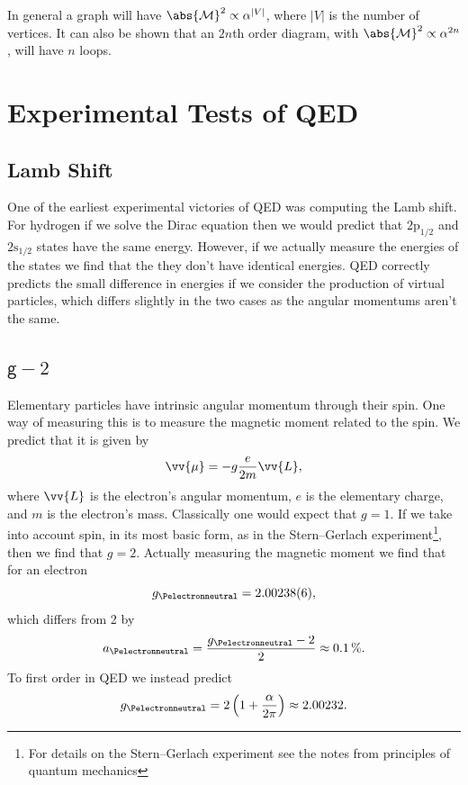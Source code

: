 \documentclass[fleqn]{NotesClass}
\newcommand*{\matrixelement}{\mathcal{M}}
\begin{document}
    In general a graph will have \(\abs{\matrixelement}^2 \propto \alpha^{|V|}\), where \(|V|\) is the number of vertices.
    It can also be shown that an \(2n\)th order diagram, with \(\abs{\matrixelement}^2 \propto \alpha^{2n}\), will have \(n\) loops.
    
    \section{Experimental Tests of QED}
    \subsection{Lamb Shift}
    One of the earliest experimental victories of QED was computing the Lamb shift.
    For hydrogen if we solve the Dirac equation then we would predict that \(2\mathrm{p}_{1/2}\) and \(2\mathrm{s}_{1/2}\) states have the same energy.
    However, if we actually measure the energies of the states we find that the they don't have identical energies.
    QED correctly predicts the small difference in energies if we consider the production of virtual particles, which differs slightly in the two cases as the angular momentums aren't the same.
    
    \subsection{\texorpdfstring{\(\mathsf{g}-2\)}{g - 2}}
    Elementary particles have intrinsic angular momentum through their spin.
    One way of measuring this is to measure the magnetic moment related to the spin.
    We predict that it is given by
    \begin{equation}
        \vv{\mu} = -g\frac{e}{2m}\vv{L},
    \end{equation}
    where \(\vv{L}\) is the electron's angular momentum, \(e\) is the elementary charge, and \(m\) is the electron's mass.
    Classically one would expect that \(g = 1\).
    If we take into account spin, in its most basic form, as in the Stern--Gerlach experiment\footnote{For details on the Stern--Gerlach experiment see the notes from principles of quantum mechanics}, then we find that \(g = 2\).
    Actually measuring the magnetic moment we find that for an electron
    \begin{equation}
        g_{\Pelectronneutral} = 2.00238(6),
    \end{equation}
    which differs from 2 by
    \begin{equation}
        a_{\Pelectronneutral} = \frac{g_{\Pelectronneutral} - 2}{2} \approx \qty{0.1}{\percent}.
    \end{equation}
    To first order in QED we instead predict
    \begin{equation}
        g_{\Pelectronneutral} = 2\left( 1 + \frac{\alpha}{2\pi} \right) \approx 2.00232.
    \end{equation}
    
\end{document}
